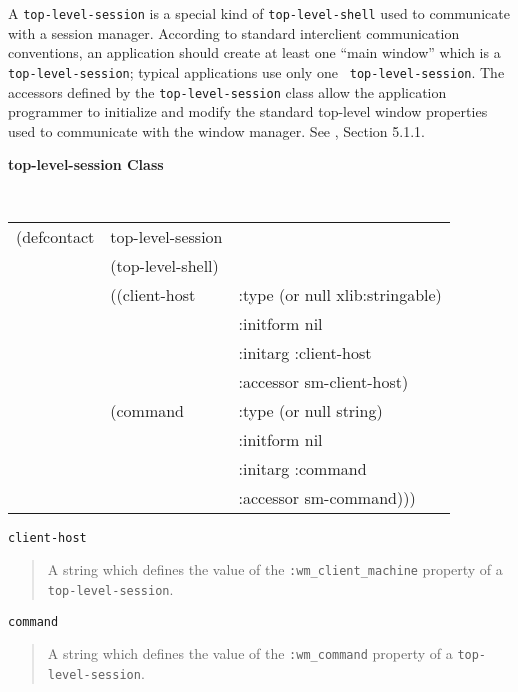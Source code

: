 A {\tt top-level-session} is a special kind of {\tt top-level-shell} used
to communicate with a session manager. 
According
to standard interclient communication conventions\cite{icccm}, an
application should create at least one ``main window'' which is a
{\tt top-level-session}; typical applications use only one {\tt
top-level-session}.
The accessors defined by the {\tt top-level-session} class allow
the application programmer to initialize and modify the standard
top-level window properties used to communicate with the window
manager. See \cite{icccm}, Section 5.1.1.

{\samepage 
{\large {\bf top-level-session \hfill Class}} 
\begin{flushright} \parbox[t]{6.125in}{
\tt
\begin{tabular}{lll}
\raggedright
(defcontact & top-level-session \\
& (top-level-shell) \\
&  ((client-host       & :type     (or null xlib:stringable) \\
&		       & :initform nil  \\
&		       & :initarg  :client-host \\
&		       & :accessor sm-client-host) \\
&   (command           & :type     (or null string) \\
&		       & :initform nil  \\
&		       & :initarg  :command \\
&		       & :accessor sm-command)))
\end{tabular}
\rm

}\end{flushright}
}

\begin{flushright} \parbox[t]{6.125in}{
{\tt client-host}
\begin{quote}
A string which defines the value of the
{\tt :wm\_client\_machine} property of a {\tt
top-level-session}. 
\end{quote}
}\end{flushright}


\begin{flushright} \parbox[t]{6.125in}{
{\tt command}
\begin{quote}
A string which defines the value of the
{\tt :wm\_command} property of a {\tt top-level-session}. 
\end{quote}
}\end{flushright}




